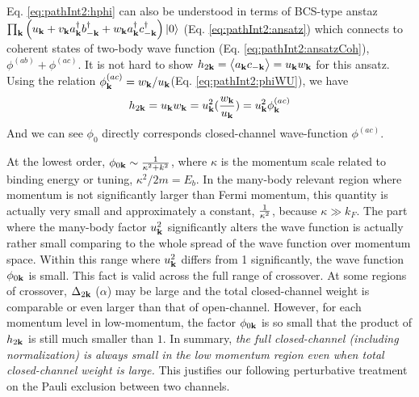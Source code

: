 Eq. \ref{eq:pathInt2:hphi} can also be understood in terms of BCS-type anstaz $\prod_{\mathbf{k}}\left(u_{\mathbf{k}}+v_{\mathbf{k}}{}a^{\dagger}_{\mathbf{k}}{}b^{\dagger}_{-\mathbf{k}}+w_{\mathbf{k}}{}a^{\dagger}_{\mathbf{k}}{}c^{\dagger}_{-\mathbf{k}}\right)\left|0\right>$ (Eq. \ref{eq:pathInt2:ansatz}) which connects to coherent states of two-body wave function (Eq. \ref{eq:pathInt2:ansatzCoh}), $\phi^{(ab)}+\phi^{(ac)}$.   It is not hard to show  $h_{2\mathbf{k}}=\bigl<{a_{\mathbf{k}}c_{-\mathbf{k}}}\bigr>=u_{\mathbf{k}}w_{\mathbf{k}}$ for this ansatz. Using the relation $\phi^{(ac)}_{\mathbf{k}}=w_{\mathbf{k}}/u_{\mathbf{k}}$(Eq. \ref{eq:pathInt2:phiWU}),  we have
\begin{equation}
h_{2\mathbf{k}}=u_{\mathbf{k}}w_{\mathbf{k}}=u_{\mathbf{k}}^{2}(\frac{w_{\mathbf{k}}}{u_{\mathbf{k}}})=u_{\mathbf{k}}^{2}\phi^{(ac)}_{\mathbf{k}}
\end{equation}
And we can see $\phi_{0}$ directly corresponds closed-channel wave-function $\phi^{(ac)}$.




At the lowest order, $\phi_{0\mathbf{k}}\sim\frac{1}{\kappa^{2}+k^{2}}$, where $\kappa$ is the momentum scale related to binding energy or tuning, $\kappa^{2}/2m=E_{b}$.     In the many-body relevant region where momentum is not significantly larger than Fermi momentum, this quantity is actually very small and approximately a constant, $\frac{1}{\kappa^{2}}$, because $\kappa{}\gg{}k_{F}$.  The part where the many-body factor $u_{\mathbf{k}}^{2}$ significantly alters the wave function is actually rather small comparing to the whole spread of the wave function over momentum space.  Within this range where $u_{\mathbf{k}}^{2}$ differs from 1 significantly, the wave function $\phi_{0\mathbf{k}}$ is small.   This fact is valid across the full range of crossover.  At some regions of crossover, $\Delta_{2\mathbf{k}}$ ($\alpha$) may be large and the total closed-channel weight is comparable or even larger than that of open-channel. However, for each momentum level in low-momentum, the factor $\phi_{0\mathbf{k}}$ is so small that the product of $h_{2\mathbf{k}}$ is still much smaller than $1$.  
In summary, \emph{the full closed-channel (including normalization) is always small in the low momentum region  even when total closed-channel weight is large.}  This justifies our following perturbative treatment on the Pauli exclusion between two channels. 

